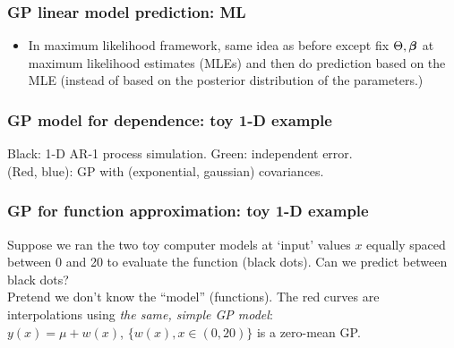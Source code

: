 \documentclass{beamer}
\begin{document}
\begin{frame}
\begin{itemize}
\end{itemize}
\end{frame}

\begin{frame}
\frametitle{GP linear model prediction: ML}
\begin{itemize}
\item In maximum likelihood framework, same idea as before except fix $\Theta, \mbox{\boldmath $\beta$}$ at maximum likelihood estimates (MLEs) and then do prediction based on the MLE (instead of based on the posterior distribution  of the parameters.)
\end{itemize}
\end{frame}


\begin{frame}
\frametitle{GP model for dependence: toy 1-D example  }
\begin{figure}
 \end{figure}
 Black: 1-D AR-1 process simulation.  Green: independent error.\\ (Red, blue): GP with (exponential, gaussian) covariances.
 \end{frame}

\begin{frame}
\frametitle{GP for function approximation: toy 1-D example  }
\vspace{-0.2in}
\begin{figure}
 \end{figure}
\vspace{-0.1in}
 Suppose we ran the two toy computer models at `input' values $x$
 equally spaced between 0 and
 20 to evaluate the function (black dots). Can we predict between black dots?\\
 Pretend we don't know the ``model'' (functions). The red curves are
 interpolations using {\it the same, simple GP model}:\\ 
{\color{blue} $y(x)=\mu + w(x)$,  $\{w(x),x\in (0,20)\}$ is a zero-mean GP.}
\end{frame}
\end{document}
